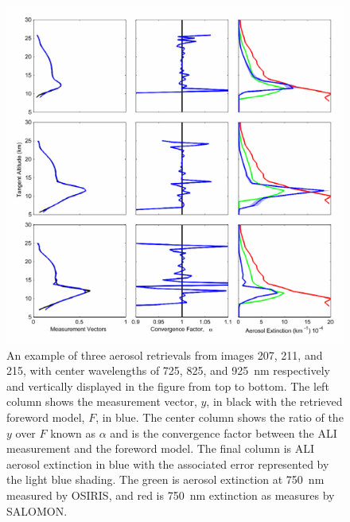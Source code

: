 \documentclass[12pt]{article}
\begin{document}
\begin{figure}
\includegraphics[width=1.0\textwidth]{./Images/AliRetreivals.pdf}
    \caption{An example of three aerosol retrievals from images 207, 211, and 215, with center wavelengths of 725, 825, and 925~nm respectively and vertically displayed in the figure from top to bottom. The left column shows the measurement vector, $y$, in black with the retrieved foreword model, $F$, in blue. The center column shows the ratio of the $y$ over $F$ known as $\alpha$ and is the convergence factor between the ALI measurement and the foreword model. The final column is ALI aerosol extinction in blue with the associated error represented by the light blue shading. The green is aerosol extinction at 750~nm measured by OSIRIS, and red is 750~nm extinction as measures by SALOMON.}
    \label{fig:AliRetreivals}
\end{figure}

\newpage
\end{document}
